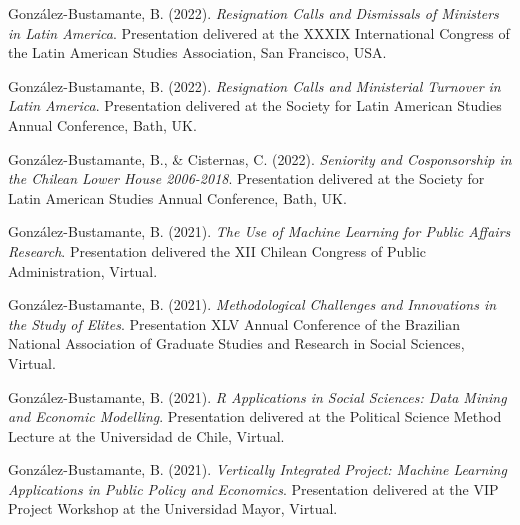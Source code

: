 \begin{publications}

\begin{benumerate}{66}

\item{\small González-Bustamante, B. (2022). {\itshape Resignation Calls and Dismissals of Ministers in Latin America}. Presentation delivered at the XXXIX International Congress of the Latin American Studies Association, San Francisco, USA.}\vspace{1mm}

\item{\small González-Bustamante, B. (2022). {\itshape Resignation Calls and Ministerial Turnover in Latin America}. Presentation delivered at the Society for Latin American Studies Annual Conference, Bath, UK.}\vspace{1mm}

\item{\small González-Bustamante, B., \& Cisternas, C. (2022). {\itshape Seniority and Cosponsorship in the Chilean Lower House 2006-2018}. Presentation delivered at the Society for Latin American Studies Annual Conference, Bath, UK.}\vspace{1mm}

\item{\small González-Bustamante, B. (2021). {\itshape The Use of Machine Learning for Public Affairs Research}. Presentation delivered the XII Chilean Congress of Public Administration, Virtual.}\vspace{1mm}

\item{\small González-Bustamante, B. (2021). {\itshape Methodological Challenges and Innovations in the Study of Elites}. Presentation XLV Annual Conference of the Brazilian National Association of Graduate Studies and Research in Social Sciences, Virtual.}\vspace{1mm}


\item{\small González-Bustamante, B. (2021). {\itshape R Applications in Social Sciences: Data Mining and Economic Modelling}. Presentation delivered at the Political Science Method Lecture at the Universidad de Chile, Virtual.}\vspace{1mm}

\item{\small González-Bustamante, B. (2021). {\itshape Vertically Integrated Project: Machine Learning Applications in Public Policy and Economics}. Presentation delivered at the VIP Project Workshop at the Universidad Mayor, Virtual.}\vspace{1mm}


\end{benumerate}
\end{publications}
